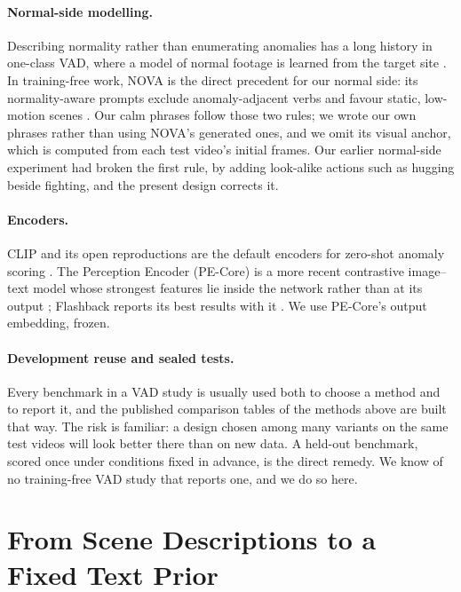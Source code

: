 \documentclass[a4paper,fleqn]{cas-sc}
\begin{document}
\paragraph{Normal-side modelling.} Describing normality rather than enumerating
anomalies has a long history in one-class VAD, where a model of normal footage is
learned from the target site \citep{liu2018shanghaitech, lv2021mpn, micorek2024mulde}.
In training-free work, NOVA is the direct precedent for our normal side: its
normality-aware prompts exclude anomaly-adjacent verbs and favour static, low-motion
scenes \citep{yin2026nova}. Our calm phrases follow those two rules; we wrote our own
phrases rather than using NOVA's generated ones, and we omit its visual anchor, which
is computed from each test video's initial frames. Our earlier normal-side experiment
had broken the first rule, by adding look-alike actions such as hugging beside
fighting, and the present design corrects it.

\paragraph{Encoders.} CLIP \citep{radford2021clip} and its open reproductions are the
default encoders for zero-shot anomaly scoring \citep{jeong2023winclip,
zhou2024anomalyclip}. The Perception Encoder (PE-Core) is a more recent contrastive
image--text model whose strongest features lie inside the network rather than at its
output \citep{bolya2025pe}; Flashback reports its best results with it
\citep{lee2025flashback}. We use PE-Core's output embedding, frozen.

\paragraph{Development reuse and sealed tests.} Every benchmark in a VAD study is
usually used both to choose a method and to report it, and the published comparison
tables of the methods above are built that way. The risk is familiar: a design chosen
among many variants on the same test videos will look better there than on new data.
A held-out benchmark, scored once under conditions fixed in advance, is the direct
remedy. We know of no training-free VAD study that reports one, and we do so here.

\section{From Scene Descriptions to a Fixed Text Prior}
\label{sec:lessons}
\end{document}
